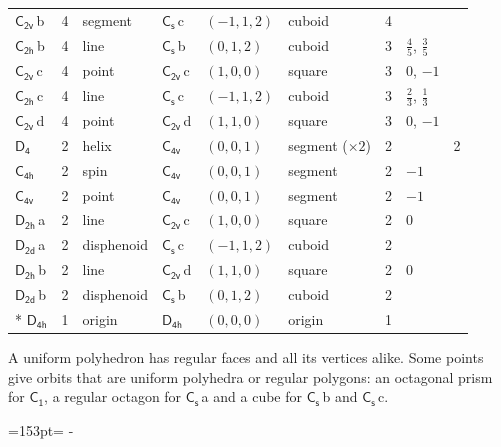 \documentclass[10pt,a4paper]{article}
\newcommand{\needspace}[1]{\par\penalty-100\begingroup\dimen0=#1\relax\dimen2=\pagegoal
  \advance\dimen2-\pagetotal\ifdim\dimen0>\dimen2\relax\ifdim\dimen2>0pt\vfil\break\fi\fi
  \endgroup}
\numberwithin{equation}{section}
\newcommand{\grp}[1]{\mathsf{#1}}
\newcommand{\clsletter}[1]{\,{\scriptsize\color{black!55}#1}}
\newlength{\fillwidth}\newlength{\cellwidth}\newlength{\colwidth}
\begin{document}
{{\begin{longtable}{@{}lrllllr>{\RaggedRight\arraybackslash}p{\fillwidth}r@{}}
\href{C2v.pdf}{$\grp{C_{2v}}$}\clsletter{b} & 4 & segment & \href{C1v.pdf}{$\grp{C_{s}}$}\clsletter{c} & $(-1, 1, 2)$ & cuboid & 4 &  & \\
\href{C2h.pdf}{$\grp{C_{2h}}$}\clsletter{b} & 4 & line & \href{C1v.pdf}{$\grp{C_{s}}$}\clsletter{b} & $(0, 1, 2)$ & cuboid & 3 & ${\tfrac{4}{5}}$, ${\tfrac{3}{5}}$ & \\
\href{C2v.pdf}{$\grp{C_{2v}}$}\clsletter{c} & 4 & point & \href{C2v.pdf}{$\grp{C_{2v}}$}\clsletter{c} & $(1, 0, 0)$ & square & 3 & ${0}$, ${-1}$ & \\
\href{C2h.pdf}{$\grp{C_{2h}}$}\clsletter{c} & 4 & line & \href{C1v.pdf}{$\grp{C_{s}}$}\clsletter{c} & $(-1, 1, 2)$ & cuboid & 3 & ${\tfrac{2}{3}}$, ${\tfrac{1}{3}}$ & \\
\href{C2v.pdf}{$\grp{C_{2v}}$}\clsletter{d} & 4 & point & \href{C2v.pdf}{$\grp{C_{2v}}$}\clsletter{d} & $(1, 1, 0)$ & square & 3 & ${0}$, ${-1}$ & \\
\href{D4.pdf}{$\grp{D_{4}}$} & 2 & helix & \href{C4v.pdf}{$\grp{C_{4v}}$} & $(0, 0, 1)$ & segment (${\times}2$) & 2 &  & 2\\
\href{C4h.pdf}{$\grp{C_{4h}}$} & 2 & spin & \href{C4v.pdf}{$\grp{C_{4v}}$} & $(0, 0, 1)$ & segment & 2 & ${-1}$ & \\
\href{C4v.pdf}{$\grp{C_{4v}}$} & 2 & point & \href{C4v.pdf}{$\grp{C_{4v}}$} & $(0, 0, 1)$ & segment & 2 & ${-1}$ & \\
\href{D2h.pdf}{$\grp{D_{2h}}$}\clsletter{a} & 2 & line & \href{C2v.pdf}{$\grp{C_{2v}}$}\clsletter{c} & $(1, 0, 0)$ & square & 2 & ${0}$ & \\
\href{D2d.pdf}{$\grp{D_{2d}}$}\clsletter{a} & 2 & disphenoid & \href{C1v.pdf}{$\grp{C_{s}}$}\clsletter{c} & $(-1, 1, 2)$ & cuboid & 2 &  & \\
\href{D2h.pdf}{$\grp{D_{2h}}$}\clsletter{b} & 2 & line & \href{C2v.pdf}{$\grp{C_{2v}}$}\clsletter{d} & $(1, 1, 0)$ & square & 2 & ${0}$ & \\
\href{D2d.pdf}{$\grp{D_{2d}}$}\clsletter{b} & 2 & disphenoid & \href{C1v.pdf}{$\grp{C_{s}}$}\clsletter{b} & $(0, 1, 2)$ & cuboid & 2 &  & \\*
\href{D4h.pdf}{$\grp{D_{4h}}$} & 1 & origin & \href{D4h.pdf}{$\grp{D_{4h}}$} & $(0, 0, 0)$ & origin & 1 &  & \\
\bottomrule\end{longtable}}}
A uniform polyhedron has regular faces and all its vertices alike. Some points give orbits that are uniform polyhedra or regular polygons: an octagonal prism for \href{C1.pdf}{$\grp{C_{1}}$}, a regular octagon for \href{C1v.pdf}{$\grp{C_{s}}$}\clsletter{a} and a cube for \href{C1v.pdf}{$\grp{C_{s}}$}\clsletter{b} and \href{C1v.pdf}{$\grp{C_{s}}$}\clsletter{c}.
\needspace{153pt}
\end{document}
